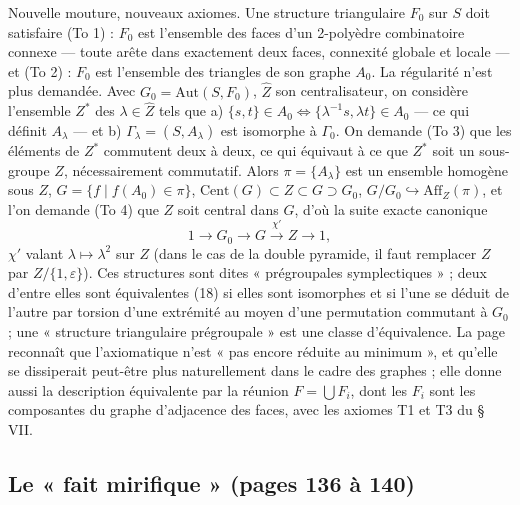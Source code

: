 \documentclass[11pt,a4paper]{article}
\begin{document}
Nouvelle mouture, nouveaux axiomes. Une structure triangulaire $F_0$ sur $S$
doit satisfaire (To 1) : $F_0$ est l'ensemble des faces d'un 2-polyèdre
combinatoire connexe --- toute arête dans exactement deux faces, connexité
globale et locale --- et (To 2) : $F_0$ est l'ensemble des triangles de son
graphe $A_0$. La régularité n'est plus demandée. Avec $G_0 = \mathrm{Aut}(S,
F_0)$, $\widehat{Z}$ son centralisateur, on considère l'ensemble $Z^{*}$ des
$\lambda \in \widehat{Z}$ tels que a) $\{s, t\} \in A_0 \iff \{\lambda^{-1} s,
\lambda t\} \in A_0$ --- ce qui définit $A_\lambda$ --- et b) $\Gamma_\lambda =
(S, A_\lambda)$ est isomorphe à $\Gamma_0$. On demande (To 3) que les éléments
de $Z^{*}$ commutent deux à deux, ce qui équivaut à ce que $Z^{*}$ soit un
sous-groupe $Z$, nécessairement commutatif. Alors $\pi = \{A_\lambda\}$ est
un ensemble homogène sous $Z$, $G = \{f \mid f(A_0) \in \pi\}$, $\mathrm{Cent}(G)
\subset Z \subset G \supset G_0$, $G/G_0 \hookrightarrow \mathrm{Aff}_Z(\pi)$,
et l'on demande (To 4) que $Z$ soit central dans $G$, d'où la suite exacte
canonique
\[
  1 \longrightarrow G_0 \longrightarrow G \xrightarrow{\ \chi'\ } Z
  \longrightarrow 1 ,
\]
$\chi'$ valant $\lambda \mapsto \lambda^2$ sur $Z$ (dans le cas de la double
pyramide, il faut remplacer $Z$ par $Z/\{1, \varepsilon\}$). Ces structures
sont dites « prégroupales symplectiques » ; deux d'entre elles sont
équivalentes (18) si elles sont isomorphes et si l'une se déduit de l'autre par
torsion d'une extrémité au moyen d'une permutation commutant à $G_0$ ; une
« structure triangulaire prégroupale » est une classe d'équivalence. La page
reconnaît que l'axiomatique n'est « pas encore réduite au minimum », et
qu'elle se dissiperait peut-être plus naturellement dans le cadre des graphes ;
elle donne aussi la description équivalente par la réunion $F = \bigcup F_i$,
dont les $F_i$ sont les composantes du graphe d'adjacence des faces, avec les
axiomes T1 et T3 du § VII.

\subsection*{Le « fait mirifique » (pages 136 à 140)}
\end{document}
